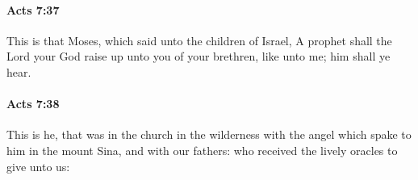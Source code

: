 		\paragraph{Acts 7:37} %
			\label{ACTS-7-37}

			This is that Moses, which said unto the children of Israel, A prophet shall the Lord your God raise up unto you of your brethren, like unto me; him shall ye hear.

			\begin{framed}
			\scriptsize
				\begin{compactdesc}
					\item[SBLG] 
				\end{compactdesc}
			\end{framed}

		\paragraph{Acts 7:38} %
			\label{ACTS-7-38}

			This is he, that was in the church in the wilderness with the angel which spake to him in the mount Sina, and with our fathers: who received the lively oracles to give unto us:

